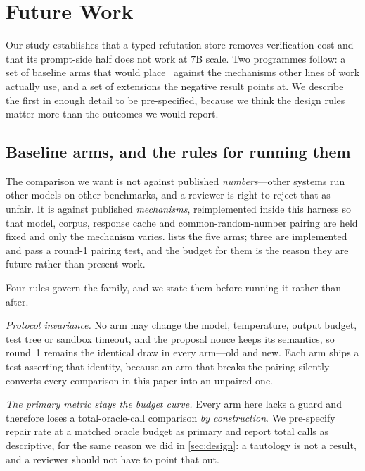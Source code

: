 \section{Future Work}
\label{sec:future}

Our study establishes that a typed refutation store removes verification cost
and that its prompt-side half does not work at $7$B scale. Two programmes
follow: a set of baseline arms that would place \CEGMem\ against the mechanisms
other lines of work actually use, and a set of extensions the negative result
points at. We describe the first in enough detail to be pre-specified, because
we think the design rules matter more than the outcomes we would report.

\subsection{Baseline arms, and the rules for running them}
\label{sec:future-arms}

The comparison we want is not against published \emph{numbers}---other systems
run other models on other benchmarks, and a reviewer is right to reject that as
unfair. It is against published \emph{mechanisms}, reimplemented inside this
harness so that model, corpus, response cache and common-random-number pairing
are held fixed and only the mechanism varies.  lists the
five arms; three are implemented and pass a round-1 pairing test, and the
budget for them is the reason they are future rather than present work.



Four rules govern the family, and we state them before running it rather than
after.

\emph{Protocol invariance.} No arm may change the model, temperature, output
budget, test tree or sandbox timeout, and the proposal nonce keeps its
semantics, so round~1 remains the identical draw in every arm---old and new.
Each arm ships a test asserting that identity, because an arm that breaks the
pairing silently converts every comparison in this paper into an unpaired one.

\emph{The primary metric stays the budget curve.} Every arm here lacks a guard
and therefore loses a total-oracle-call comparison \emph{by construction}. We
pre-specify repair rate at a matched oracle budget as primary and report total
calls as descriptive, for the same reason we did in \cref{sec:design}: a
tautology is not a result, and a reviewer should not have to point that out.

